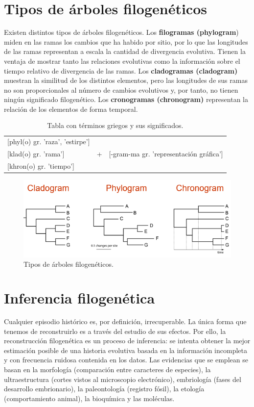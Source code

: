 \section{Tipos de árboles filogenéticos}
Existen distintos tipos de árboles filogenéticos. Los \textbf{filogramas (phylogram}) miden en las ramas los cambios que ha habido por sitio, por lo que las longitudes de las ramas representan a escala la cantidad de divergencia evolutiva. Tienen la ventaja de mostrar tanto las relaciones evolutivas como la información sobre el tiempo relativo de divergencia de las ramas. Los \textbf{cladogramas (cladogram)} muestran la similitud de los distintos elementos, pero las longitudes de sus ramas no son proporcionales al número de cambios evolutivos y, por tanto, no tienen ningún significado filogenético. Los \textbf{cronogramas (chronogram)} representan la relación de los elementos de forma temporal.

\begin{table}[h]
\centering
\begin{tabular}{l c c}
\hline
\multicolumn{1}{l}{[phyl(o) gr. 'raza', 'estirpe']} & \multirow{3}{1em}{+} & \multirow{3}{12em}{[-gram-ma gr. 'representación gráfica']} \\
\multicolumn{1}{l}{[klad(o) gr. 'rama']} & & \\
\multicolumn{1}{l}{[khron(o) gr. 'tiempo']} & & \\
\hline
\end{tabular}
\caption{Tabla con términos griegos y sus significados.}
\end{table}

\begin{figure}[htbp]
\centering
\includegraphics[width=0.5\linewidth]{figs/tipos-arboles.png}
\caption{Tipos de árboles filogenéticos.}
\end{figure}

\section{Inferencia filogenética}
Cualquier episodio histórico es, por definición, irrecuperable. La única forma que tenemos de reconstruirlo es a través del estudio de sus efectos. Por ello, la reconstrucción filogenética es un proceso de inferencia: se intenta obtener la mejor estimación posible de una historia evolutiva basada en la información incompleta y con frecuencia ruidosa contenida en los datos. Las evidencias que se emplean se basan en la morfología (comparación entre caracteres de especies), la ultraestructura (cortes vistos al microscopio electrónico), embriología (fases del desarrollo embrionario), la paleontología (registro fósil), la etología (comportamiento animal), la bioquímica y las moléculas. 

